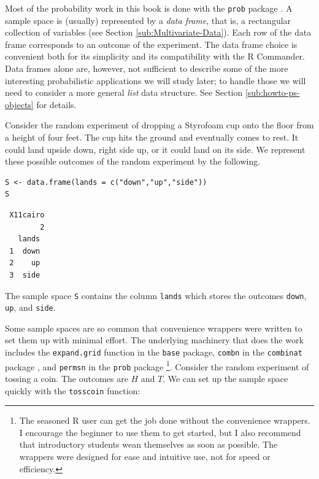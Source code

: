 \documentclass[captions=tableheading]{scrbook}
\begin{document}
Most of the probability work in this book is done with the \texttt{prob} package \cite{Kernsprob}. A sample space is (usually) represented by a \emph{data frame}, that is, a rectangular collection of variables (see Section \ref{sub:Multivariate-Data}). Each row of the data frame corresponds to an outcome of the experiment. The data frame choice is convenient both for its simplicity and its compatibility with the \textsf{R} Commander. Data frames alone are, however, not sufficient to describe some of the more interesting probabilistic applications we will study later; to handle those we will need to consider a more general \emph{list} data structure. See Section \ref{sub:howto-ps-objects} for details.

\begin{example}
Consider the random experiment of dropping a Styrofoam cup onto the floor from a height of four feet. The cup hits the ground and eventually comes to rest. It could land upside down, right side up, or it could land on its side. We represent these possible outcomes of the random experiment by the following.


\begin{verbatim}
S <- data.frame(lands = c("down","up","side"))
S
\end{verbatim}

\begin{verbatim}
 X11cairo 
        2
   lands
 1  down
 2    up
 3  side
\end{verbatim}

The sample space \texttt{S} contains the column \texttt{lands} which stores the outcomes \texttt{down}, \texttt{up}, and \texttt{side}. 

\end{example}

Some sample spaces are so common that convenience wrappers were written to set them up with minimal effort. The underlying machinery that does the work includes the \texttt{expand.grid} function in the \texttt{base} package, \texttt{combn} in the \texttt{combinat} package \cite{combinat}, and \texttt{permsn} in the \texttt{prob} package
\footnote{The seasoned \textsf{R} user can get the job done without the convenience wrappers. I encourage the beginner to use them to get started, but I also recommend that introductory students wean themselves as soon as possible. The wrappers were designed for ease and intuitive use, not for speed or efficiency.}.
Consider the random experiment of tossing a coin. The outcomes are \(H\) and \(T\). We can set up the sample space quickly with the \texttt{tosscoin} function:
\end{document}

